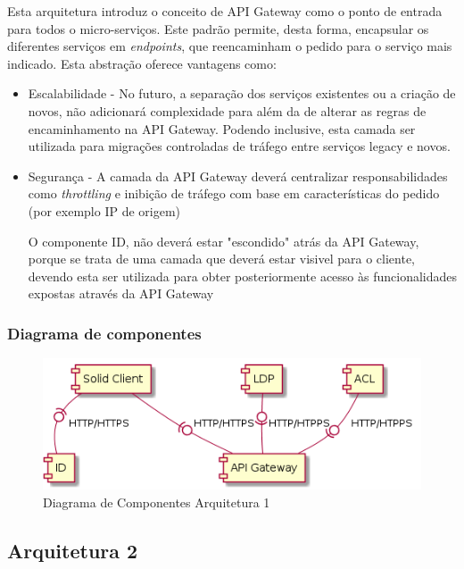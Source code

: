 Esta arquitetura introduz o conceito de API Gateway como o ponto de entrada para todos o micro-serviços. Este padrão permite, desta forma, encapsular os diferentes serviços em \emph{endpoints}, que reencaminham o pedido para o serviço mais indicado. Esta abstração oferece vantagens como:

\begin{itemize}
    \item Escalabilidade - No futuro, a separação dos serviços existentes ou a criação de novos, não adicionará complexidade para além da de alterar as regras de encaminhamento na API Gateway. Podendo inclusive, esta camada ser utilizada para migrações controladas de tráfego entre serviços legacy e novos.
    \item Segurança - A camada da API Gateway deverá centralizar responsabilidades como \emph{throttling} e inibição de tráfego com base em características do pedido (por exemplo IP de origem)
    
O componente ID, não deverá estar "escondido" atrás da API Gateway, porque se trata de uma camada que deverá estar visivel para o cliente, devendo esta ser utilizada para obter posteriormente acesso às funcionalidades expostas através da API Gateway
\end{itemize}


\subsubsection{Diagrama de componentes}
\begin{figure}[h]
    \begin{center}
    \includegraphics[width=1 \textwidth]{figures/component_diagram_2.png}
    \caption{Diagrama de Componentes Arquitetura 1}
    \end{center}
\end{figure}
\pagebreak

\subsection{Arquitetura 2}

